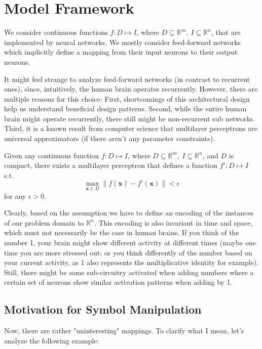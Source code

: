 \documentclass[../../main.tex]{subfiles}
\begin{document}
    \section{Model Framework}
    We consider continuous functions $f: D \mapsto I$, where $D \subseteq \mathbb{R}^m , \ I \subseteq \mathbb{R}^n$, that are implemented by neural networks. We mostly consider feed-forward networks which implicitly define a mapping from their input neurons to their output neurons.

    It might feel strange to analyze feed-forward networks (in contrast to recurrent ones), since, intuitively, the human brain operates recurrently. However, there are multiple reasons for this choice: First, shortcomings of this architectural design help us understand beneficial design patterns. Second, while the entire human brain might operate recurrently, there still might be non-recurrent sub networks. Third, it is a known result from computer science that multilayer perceptrons are universal approximators (if there aren't any parameter constraints).

    \begin{theorem}
        Given any continuous function $f: D \mapsto I$, where $D \subseteq \mathbb{R}^m , \ I \subseteq \mathbb{R}^n$, and $D$ is compact, there exists a multilayer perceptron that defines a function $f': D \mapsto I$ s.t. 
        \[
            \underset{\bm{x} \in D}{\max} \|f(\bm{x}) - f'(\bm{x})\| < \epsilon
        \]
        for any $\epsilon > 0$.
    \end{theorem}

    Clearly, based on the assumption we have to define an encoding of the instances of our problem domain to $\mathbb{R}^n$. This encoding is also invariant in time and space, which must not necessarily be the case in human brains. If you think of the number 1, your brain might show different activity at different times (maybe one time you are more stressed out; or you think differently of the number based on your current activity, as 1 also represents the multiplicative identity for example). Still, there might be some sub-circuitry activated when adding numbers where a certain set of neurons show similar activation patterns when adding by 1.

    \subsection{Motivation for Symbol Manipulation}
    Now, there are rather "uninteresting" mappings. To clarify what I mean, let's analyze the following example:
    
\end{document}
